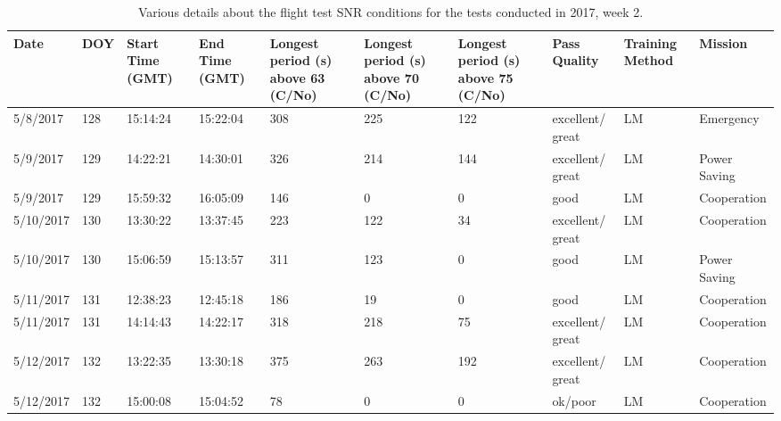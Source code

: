 \begin{landscape}
\begin{table}[ht]
\centering
\caption{Various details about the flight test SNR conditions for the tests conducted in 2017, week 2.}
\begin{tabular}{ | m{0.8in} | m{0.5in}| m{0.8in} |  m{0.8in} | m{0.8in}| m{0.8in} | m{0.8in} | m{0.8in}| m{0.8in} | m{0.82in} |}
\hline
Date & DOY& Start Time (GMT) & End Time (GMT) & Longest period (s) above 63 (C/No) & Longest period (s) above 70 (C/No) & Longest period (s) above 75 (C/No) & Pass Quality & Training Method & Mission\\
\hline
\hline
5/8/2017&128&15:14:24&15:22:04&308&225&122&excellent/ great&LM&Emergency\\ \hline
5/9/2017&129&14:22:21&14:30:01&326&214&144&excellent/ great&LM&Power Saving\\ \hline
5/9/2017&129&15:59:32&16:05:09&146&0&0&good&LM&Cooperation\\ \hline
5/10/2017&130&13:30:22&13:37:45&223&122&34&excellent/ great&LM&Cooperation\\ \hline
5/10/2017&130&15:06:59&15:13:57&311&123&0&good&LM&Power Saving\\ \hline
5/11/2017&131&12:38:23&12:45:18&186&19&0&good&LM&Cooperation\\ \hline
5/11/2017&131&14:14:43&14:22:17&318&218&75&excellent/ great&LM&Cooperation\\ \hline
5/12/2017&132&13:22:35&13:30:18&375&263&192&excellent/ great&LM&Cooperation\\ \hline
5/12/2017&132&15:00:08&15:04:52&78&0&0&ok/poor&LM&Cooperation\\ \hline
\end{tabular}
\end{table}


\end{landscape}
